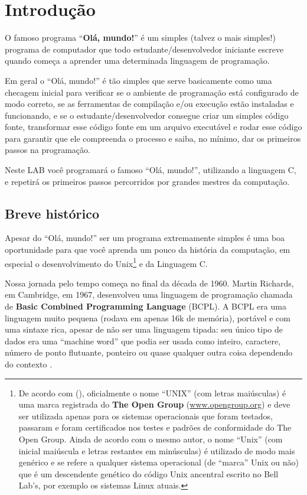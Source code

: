 \section{Introdução}
\label{sec:intro}

O famoso programa ``\textbf{Olá, mundo!}'' é um simples (talvez o mais simples!)
programa de computador que todo estudante/desenvolvedor iniciante escreve quando
começa a aprender uma determinada linguagem de programação.

Em geral o ``Olá, mundo!'' é tão simples que serve basicamente como uma checagem
inicial para verificar se o ambiente de programação está configurado de modo
correto, se as ferramentas de compilação e/ou execução estão instaladas e
funcionando, e se o estudante/desenvolvedor consegue criar um simples código
fonte, transformar esse código fonte em um arquivo executável e rodar esse
código para garantir que ele compreenda o processo e saiba, no mínimo, dar os
primeiros passos na programação.

Neste LAB você programará o famoso ``Olá, mundo!'', utilizando a linguagem C, e
repetirá os primeiros passos percorridos por grandes mestres da computação.


\subsection{Breve histórico}
\label{sec:intro:hist}

Apesar do ``Olá, mundo!'' ser um programa extremamente simples é uma boa
oportunidade para que você aprenda um pouco da história da computação, em
especial o desenvolvimento do Unix\footnote{De acordo com
 (\citeyear{raymond2004}), oficialmente o nome
``UNIX'' (com letras maiúsculas) é uma marca registrada do \textbf{The Open
Group} (\url{www.opengroup.org}) e deve ser utilizada apenas para os sistemas
operacionais que foram testados, passaram e foram certificados nos testes e
padrões de conformidade do The Open Group. Ainda de acordo com o mesmo autor, o
nome ``Unix'' (com inicial maiúscula e letras restantes em minúsculas) é
utilizado de modo mais genérico e se refere a qualquer sistema operacional (de
``marca'' Unix ou não) que é um descendente genético do código Unix ancentral
escrito no Bell Lab's, por exemplo os sistemas Linux atuais.} e da Linguagem C.

Nossa jornada pelo tempo começa no final da década de 1960. Martin Richards, em
Cambridge, em 1967, desenvolveu uma linguagem de programação chamada de
\textbf{Basic Combined Programming Language} (BCPL). A BCPL era uma linguagem
muito pequena (rodava em apenas 16k de memória), portável e com uma sintaxe
rica, apesar de não ser uma linguagem tipada: seu único tipo de dados era uma
``machine word'' que podia ser usada como inteiro, caractere, número de ponto
flutuante, ponteiro ou quase qualquer outra coisa dependendo do contexto
\cite{raymond91}.
